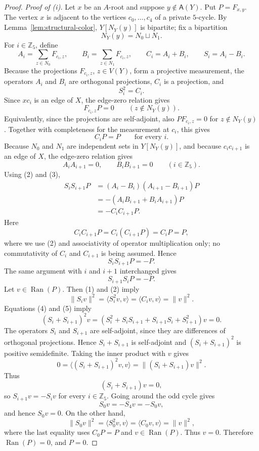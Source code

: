\documentclass[10pt,a4paper]{amsart}
\newcommand{\Aset}{\mathsf A}
\begin{document}
\begin{proof}
\smallskip
\noindent\emph{Proof of (i).}
Let $x$ be an $A$-root and suppose $y\notin \Aset(Y)$.  Put $P=F_{x,y}$.  The vertex $x$ is adjacent to the vertices $c_0,\ldots,c_4$ of a private $5$-cycle.  By Lemma~\ref{lem:structural-color}, $Y[N_Y(y)]$ is bipartite; fix a bipartition
\[
   N_Y(y)=N_0\sqcup N_1.
\]
For $i\in\mathbb Z_5$, define
\[
   A_i=\sum_{z\in N_0}F_{c_i,z},\qquad
   B_i=\sum_{z\in N_1}F_{c_i,z},\qquad
   C_i=A_i+B_i,\qquad S_i=A_i-B_i.
\]
Because the projections $F_{c_i,z}$, $z\in V(Y)$, form a projective measurement, the operators $A_i$ and $B_i$ are orthogonal projections, $C_i$ is a projection, and
\[
   S_i^2=C_i. \tag{1}
\]
Since $xc_i$ is an edge of $X$, the edge-zero relation gives
\[
   F_{c_i,z}P=0\qquad (z\notin N_Y(y)).
\]
Equivalently, since the projections are self-adjoint, also $PF_{c_i,z}=0$ for $z\notin N_Y(y)$.  Together with completeness for the measurement at $c_i$, this gives
\[
   C_iP=P\qquad\text{for every }i. \tag{2}
\]
Because $N_0$ and $N_1$ are independent sets in $Y[N_Y(y)]$, and because $c_ic_{i+1}$ is an edge of $X$, the edge-zero relation gives
\[
   A_iA_{i+1}=0,
   \qquad
   B_iB_{i+1}=0
   \qquad (i\in\mathbb Z_5). \tag{3}
\]
Using (2) and (3),
\[
\begin{aligned}
   S_iS_{i+1}P
   &=(A_i-B_i)(A_{i+1}-B_{i+1})P\\
   &=-(A_iB_{i+1}+B_iA_{i+1})P\\
   &=-C_iC_{i+1}P.
\end{aligned}
\]
Here
\[
   C_iC_{i+1}P=C_i(C_{i+1}P)=C_iP=P,
\]
where we use (2) and associativity of operator multiplication only; no commutativity of $C_i$ and $C_{i+1}$ is being assumed.  Hence
\[
   S_iS_{i+1}P=-P. \tag{4}
\]
The same argument with $i$ and $i+1$ interchanged gives
\[
   S_{i+1}S_iP=-P. \tag{5}
\]
Let $v\in\operatorname{Ran}(P)$.  Then (1) and (2) imply
\[
   \|S_iv\|^2=\langle S_i^2v,v\rangle=\langle C_iv,v\rangle=\|v\|^2.
\]
Equations (4) and (5) imply
\[
   (S_i+S_{i+1})^2v
   =(S_i^2+S_iS_{i+1}+S_{i+1}S_i+S_{i+1}^2)v=0.
\]
The operators $S_i$ and $S_{i+1}$ are self-adjoint, since they are differences of orthogonal projections.  Hence $S_i+S_{i+1}$ is self-adjoint and $(S_i+S_{i+1})^2$ is positive semidefinite.  Taking the inner product with $v$ gives
\[
   0=\langle (S_i+S_{i+1})^2v,v\rangle
    =\|(S_i+S_{i+1})v\|^2.
\]
Thus
\[
   (S_i+S_{i+1})v=0,
\]
so $S_{i+1}v=-S_iv$ for every $i\in\mathbb Z_5$.  Going around the odd cycle gives
\[
   S_0v=-S_4v=-S_0v,
\]
and hence $S_0v=0$.  On the other hand,
\[
   \|S_0v\|^2=\langle S_0^2v,v\rangle=\langle C_0v,v\rangle=\|v\|^2,
\]
where the last equality uses $C_0P=P$ and $v\in\operatorname{Ran}(P)$.  Thus $v=0$.  Therefore $\operatorname{Ran}(P)=0$, and $P=0$.


\end{proof}
\end{document}
